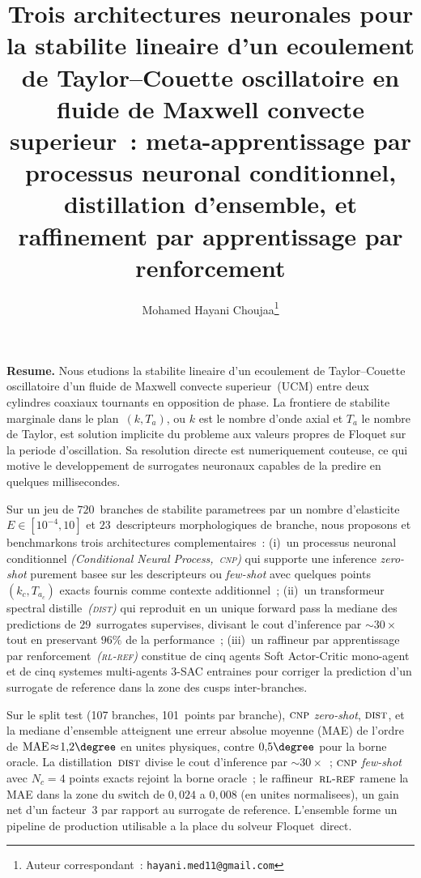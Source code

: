 \documentclass[11pt,a4paper]{article}
\title{
\vspace{-1.4cm}
\textbf{\large Trois architectures neuronales pour la stabilite lineaire
d'un ecoulement de Taylor--Couette oscillatoire en fluide de Maxwell
convecte superieur~: meta-apprentissage par processus neuronal
conditionnel, distillation d'ensemble, et raffinement par
apprentissage par renforcement}
}
\author[1]{Mohamed Hayani Choujaa\thanks{Auteur correspondant~:
\texttt{hayani.med11@gmail.com}}}
\affil[1]{Laboratoire de Mecanique, Faculte des Sciences Ain Chock,
Universite Hassan II de Casablanca, Maroc}
\date{}
\newcommand{\Ta}{T_a}
\newcommand{\CNP}{\textsc{cnp}}              %
\newcommand{\DST}{\textsc{dist}}             %
\newcommand{\RLR}{\textsc{rl-ref}}           %
\begin{document}
\maketitle

\begin{center}
\begin{minipage}{0.95\linewidth}
\noindent\small\textbf{Resume.}\quad
Nous etudions la stabilite lineaire d'un ecoulement de
Taylor--Couette oscillatoire d'un fluide de Maxwell convecte
superieur~(UCM) entre deux cylindres coaxiaux tournants en
opposition de phase. La frontiere de stabilite marginale dans le
plan~$(k,\Ta)$, ou $k$ est le nombre d'onde axial et $\Ta$ le
nombre de Taylor, est solution implicite du probleme aux valeurs
propres de Floquet sur la periode d'oscillation. Sa resolution
directe est numeriquement couteuse, ce qui motive le developpement
de surrogates neuronaux capables de la predire en quelques
millisecondes.

Sur un jeu de $720$~branches de stabilite parametrees par un
nombre d'elasticite $E\!\in\![10^{-4},10]$ et $23$~descripteurs
morphologiques de branche, nous proposons et benchmarkons trois
architectures complementaires~:
(i)~un processus neuronal conditionnel \emph{(Conditional Neural
Process,~\CNP{})} qui supporte une inference \emph{zero-shot}
purement basee sur les descripteurs ou \emph{few-shot} avec
quelques points $(k_c,\Ta_c)$ exacts fournis comme contexte
additionnel~;
(ii)~un transformeur spectral distille~\emph{(\DST{})} qui
reproduit en un unique forward pass la mediane des predictions
de $29$~surrogates supervises, divisant le cout d'inference par
$\sim\!30\times$ tout en preservant $96\%$ de la performance~;
(iii)~un raffineur par apprentissage par renforcement~\emph{(\RLR{})}
constitue de cinq agents Soft Actor-Critic mono-agent et de cinq
systemes multi-agents 3-SAC entraines pour corriger la prediction
d'un surrogate de reference dans la zone des cusps inter-branches.

Sur le split test (107 branches, 101~points par branche),
$\CNP$ \emph{zero-shot}, $\DST$, et la mediane d'ensemble
atteignent une erreur absolue moyenne (MAE) de l'ordre de
$\mathrm{MAE}\!\approx\!1{,}2\degree$ en unites physiques,
contre $0{,}5\degree$ pour la borne oracle. La distillation~$\DST$
divise le cout d'inference par $\sim\!30\times$~;
$\CNP$ \emph{few-shot} avec $N_c\!=\!4$ points exacts rejoint
la borne oracle~; le raffineur~$\RLR$ ramene la MAE dans la zone
du switch de $0{,}024$ a $0{,}008$ (en unites normalisees), un
gain net d'un facteur~3 par rapport au surrogate de reference.
L'ensemble forme un pipeline de production utilisable a la place
du solveur Floquet~direct.
\end{minipage}
\end{center}
\vspace{0.4cm}
\end{document}
